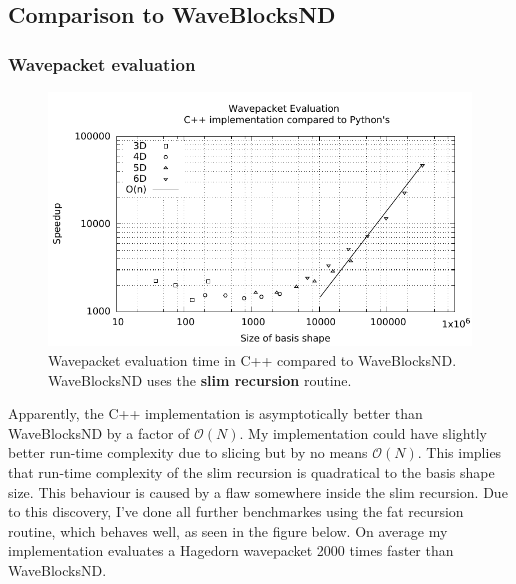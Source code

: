 \documentclass{article}
\begin{document}
\subsection{Comparison to WaveBlocksND}

\subsubsection{Wavepacket evaluation}

\begin{figure}[H]
  \centering
  \includegraphics[width=1.0\textwidth]{plots/hawp_eval_cvp_slim}
  \caption{Wavepacket evaluation time in C++ compared to WaveBlocksND.
    WaveBlocksND uses the \textbf{slim recursion} routine.}
  \label{fig:hawp_eval_cvp_slim}
\end{figure}

Apparently, the C++ implementation is asymptotically better than WaveBlocksND by a factor of
\(\mathcal{O}(N)\). My implementation could have slightly better run-time complexity due to slicing but by
no means \(\mathcal{O}(N)\). This implies that run-time complexity of the slim recursion is
quadratical to the basis shape size.
This behaviour is caused by a flaw somewhere inside the slim recursion.
Due to this discovery, I've done all further benchmarkes using the fat recursion routine,
which behaves well, as seen in the figure below. On average my implementation evaluates a
Hagedorn wavepacket 2000 times faster than WaveBlocksND.
\end{document}
